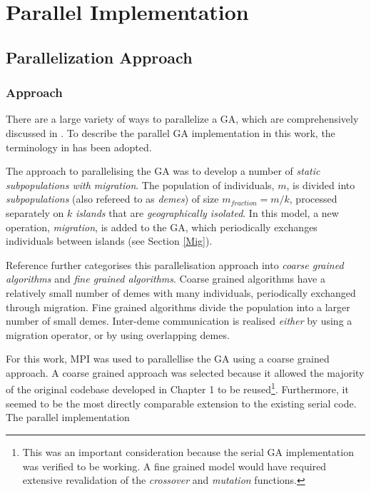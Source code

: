\documentclass{report}
\begin{document}
\newpage
\chapter{Parallel Implementation}

\section{Parallelization Approach}

\subsection{Approach}
There are a large variety of ways to parallelize a GA, which are comprehensively discussed in \cite{nowostawski1999parallel}. To describe the parallel GA implementation in this work, the terminology in \cite{nowostawski1999parallel} has been adopted. 

The approach to parallelising the GA was to develop a number of \emph{static subpopulations with migration}. The population of individuals, \(m\), is divided into \emph{subpopulations} (also refereed to as \emph{demes}) of size \(m_{fraction}=m/k\), processed separately on \(k\) \emph{islands} that are \emph{geographically isolated}. In this model, a new operation, \emph{migration}, is added to the GA, which periodically exchanges individuals between islands (see Section \ref{Mig}).  

Reference \cite{nowostawski1999parallel} further categorises this parallelisation approach into \emph{coarse grained algorithms} and \emph{fine grained algorithms}.
Coarse grained algorithms have a relatively small number of demes with many individuals, periodically exchanged through migration. Fine grained algorithms divide the population into a larger number of small demes. Inter-deme communication is realised \emph{either} by using a migration operator, or by using overlapping demes.

For this work, MPI was used to parallellise the GA using a coarse grained approach. A coarse grained approach was selected because it allowed the majority of the original codebase developed in Chapter 1 to be reused\footnote{This was an important consideration because the serial GA implementation was verified to be working. A fine grained model would have required extensive revalidation of the \emph{crossover} and \emph{mutation} functions.}. Furthermore, it seemed to be the most directly comparable extension to the existing serial code. The parallel implementation 
\end{document}
